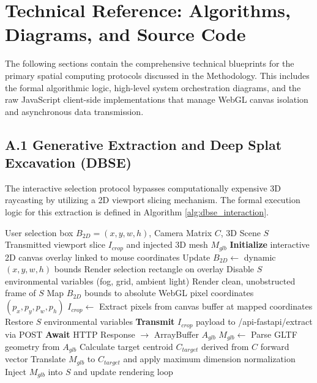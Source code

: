 \newpage
\appendix
\section{Technical Reference: Algorithms, Diagrams, and Source Code}
\label{appendix:technical_reference}

The following sections contain the comprehensive technical blueprints for the primary spatial computing protocols discussed in the Methodology. This includes the formal algorithmic logic, high-level system orchestration diagrams, and the raw JavaScript client-side implementations that manage WebGL canvas isolation and asynchronous data transmission.

\subsection{A.1 Generative Extraction and Deep Splat Excavation (DBSE)}

The interactive selection protocol bypasses computationally expensive 3D raycasting by utilizing a 2D viewport slicing mechanism. The formal execution logic for this extraction is defined in Algorithm \ref{alg:dbse_interaction}.

\begin{algorithm}[H]
\caption{Client-Side Bounding Box Extraction and Mesh Injection Protocol}
\label{alg:dbse_interaction}
\begin{algorithmic}[1]
\Require User selection box $B_{2D} = (x, y, w, h)$, Camera Matrix $C$, 3D Scene $S$
\Ensure Transmitted viewport slice $I_{crop}$ and injected 3D mesh $M_{glb}$
\State \textbf{Initialize} interactive 2D canvas overlay linked to mouse coordinates
    \State Update $B_{2D} \leftarrow$ dynamic $(x, y, w, h)$ bounds
    \State Render selection rectangle on overlay
\EndIf
{}
    \State Disable $S$ environmental variables (fog, grid, ambient light)
    \State Render clean, unobstructed frame of $S$
    \State Map $B_{2D}$ bounds to absolute WebGL pixel coordinates $(p_x, p_y, p_w, p_h)$
    \State $I_{crop} \leftarrow$ Extract pixels from canvas buffer at mapped coordinates
    \State Restore $S$ environmental variables
    \State \textbf{Transmit} $I_{crop}$ payload to /api-fastapi/extract via POST
    \State \textbf{Await} HTTP Response $\rightarrow$ ArrayBuffer $A_{glb}$
    \State $M_{glb} \leftarrow$ Parse GLTF geometry from $A_{glb}$
    \State Calculate target centroid $C_{target}$ derived from $C$ forward vector
    \State Translate $M_{glb}$ to $C_{target}$ and apply maximum dimension normalization
    \State Inject $M_{glb}$ into $S$ and update rendering loop
\EndIf
\end{algorithmic}
\end{algorithm}

